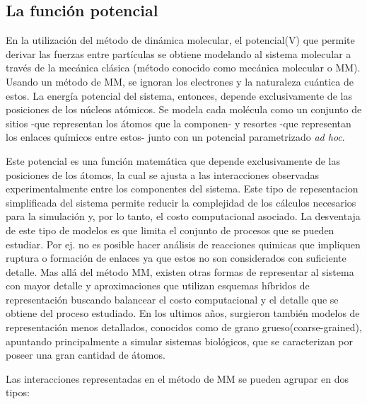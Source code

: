 \subsection{La función potencial}


En la utilización del método de dinámica molecular, el potencial(V) que permite derivar las fuerzas entre partículas se obtiene modelando al sistema molecular a través de la mecánica clásica (método conocido como mecánica molecular o MM).
Usando un método de MM, se ignoran los electrones y la naturaleza cuántica de estos. La energía potencial del sistema, entonces, depende exclusivamente de las posiciones de los núcleos atómicos. 
Se modela cada molécula como un conjunto de sitios -que representan los átomos que la componen- y resortes -que representan los enlaces químicos entre estos- junto con un potencial parametrizado \textit{ad hoc}.

Este potencial es una función matemática que depende exclusivamente de las posiciones de los átomos, la cual se ajusta a las interacciones observadas experimentalmente entre los componentes del sistema. 
Este tipo de repesentacion simplificada del sistema permite reducir la complejidad de los cálculos necesarios para la simulación y, por lo tanto, el costo computacional asociado. 
La desventaja de este tipo de modelos es que limita el conjunto de procesos que se pueden estudiar. 
Por ej. no es posible hacer análisis de reacciones quimicas que impliquen ruptura o formación de enlaces ya que estos no son considerados con suficiente detalle. 
Mas allá del método MM, existen otras formas de representar al sistema con mayor detalle y aproximaciones que utilizan esquemas híbridos de representación\cite{senn2009qm} buscando balancear el costo computacional y
el detalle que se obtiene del proceso estudiado.
En los ultimos años, surgieron también modelos de representación menos detallados, conocidos como de grano grueso(coarse-grained)\cite{noid2013perspective}, apuntando principalmente a simular sistemas biológicos, que se caracterizan por poseer una gran cantidad de átomos.

Las interacciones representadas en el método de MM se pueden agrupar en dos tipos:

